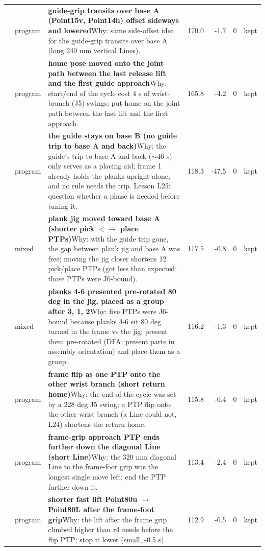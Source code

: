 {\begin{longtable}{>{\raggedleft}p{5mm} p{12mm} >{\raggedright}p{85mm} r r r p{14mm}}
23 & program & \textbf{guide-grip transits over base A (Point15v, Point14h) offset sideways and lowered}\newline Why: same side-offset idea for the guide-grip transits over base A (long 240 mm vertical Lines). & 170.0 & -1.7 & 0 & kept \\
24 & program & \textbf{home pose moved onto the joint path between the last release lift and the first guide approach}\newline Why: start/end of the cycle cost 4 s of wrist-branch (J5) swings; put home on the joint path between the last lift and the first approach. & 165.8 & -4.2 & 0 & kept \\
25 & program & \textbf{the guide stays on base B (no guide trip to base A and back)}\newline Why: the guide's trip to base A and back ($\sim$46 s) only serves as a placing aid; frame 1 already holds the planks upright alone, and no rule needs the trip. Lesson L25: question whether a phase is needed before tuning it. & 118.3 & -47.5 & 0 & kept \\
26 & mixed & \textbf{plank jig moved toward base A (shorter pick $<$$\to$ place PTPs)}\newline Why: with the guide trip gone, the gap between plank jig and base A was free; moving the jig closer shortens 12 pick/place PTPs (got less than expected: those PTPs were J6-bound). & 117.5 & -0.8 & 0 & kept \\
27 & mixed & \textbf{planks 4-6 presented pre-rotated 80 deg in the jig, placed as a group after 3, 1, 2}\newline Why: five PTPs were J6-bound because planks 4-6 sit 80 deg turned in the frame vs the jig; present them pre-rotated (DFA: present parts in assembly orientation) and place them as a group. & 116.2 & -1.3 & 0 & kept \\
28 & program & \textbf{frame flip as one PTP onto the other wrist branch (short return home)}\newline Why: the end of the cycle was set by a 228 deg J5 swing; a PTP flip onto the other wrist branch (a Line could not, L24) shortens the return home. & 115.8 & -0.4 & 0 & kept \\
29 & program & \textbf{frame-grip approach PTP ends further down the diagonal Line (short Line)}\newline Why: the 320 mm diagonal Line to the frame-foot grip was the longest single move left; end the PTP further down it. & 113.4 & -2.4 & 0 & kept \\
30 & program & \textbf{shorter fast lift Point80u $\to$ Point80L after the frame-foot grip}\newline Why: the lift after the frame grip climbed higher than r4 needs before the flip PTP; stop it lower (small, -0.5 s). & 112.9 & -0.5 & 0 & kept \\
\bottomrule
\end{longtable}
}
